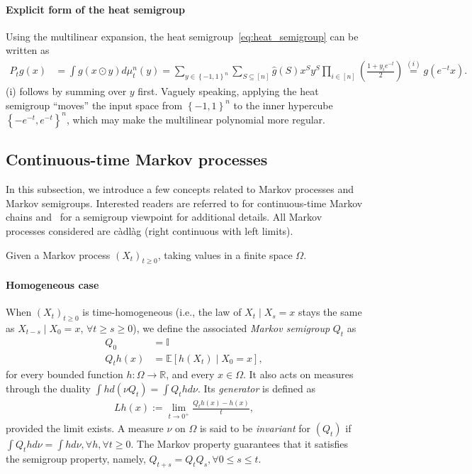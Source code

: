 \documentclass[11pt]{article}
\theoremstyle{named}
\theoremstyle{plain}
\newcommand{\defn}{:=}
\newcommand{\real}{\ensuremath{\mathbb{R}}}
\newcommand{\Ind}{\ensuremath{\mathbb{I}}}
\newcommand{\Exs}{\ensuremath{{\mathbb{E}}}}
\newcommand{\parenth}[1]{\left( #1 \right)}
\newcommand{\braces}[1]{\left\{ #1 \right \}}
\begin{document}
\paragraph{Explicit form of the heat semigroup} Using the multilinear expansion, the heat semigroup~\eqref{eq:heat_semigroup} can be written as
\begin{align}
  \label{eq:explicit_heat_seimgroup}
  P_t g (x) &= \int g(x \odot y) d\mu_t^n(y) = \sum_{y \in \braces{-1,1}^n} \sum_{S \subseteq [n]} \hat{g}(S) x^S y^S \prod_{i \in [n]} \parenth{\frac{1+y_i e^{-t}}{2}} \overset{(i)}{=} g(e^{-t} x).
\end{align}
(i) follows by summing over $y$ first. Vaguely speaking, applying the heat semigroup ``moves'' the input space from $\braces{-1,1}^n$ to the inner hypercube $\braces{-e^{-t}, e^{-t}}^n$, which may make the multilinear polynomial more regular.

\subsection{Continuous-time Markov processes}
\label{sub:continuous_time_Markov}
In this subsection, we introduce a few concepts related to Markov processes and Markov semigroups. Interested readers are referred to \cite{anderson2012continuous} for continuous-time Markov chains and~\cite{pazy2012semigroups} for a semigroup viewpoint for additional details. All Markov processes considered are c\`adl\`ag (right continuous with left limits).

Given a Markov process $(X_t)_{t \geq 0}$, taking values in a finite space $\Omega$.

\paragraph{Homogeneous case} When $(X_t)_{t \geq 0}$ is time-homogeneous (i.e., the law of $X_t \mid X_s = x$ stays the same as $X_{t-s} \mid X_0 = x$, $\forall t\geq s \geq 0$), we define the associated \textit{Markov semigroup} $Q_t$ as 
\begin{align*}
  Q_0 &= \Ind \\
  Q_t h(x) &= \Exs[h(X_t) \mid X_0 = x],
\end{align*}
for every bounded function $h: \Omega \to \real$, and every $x \in \Omega$. It also acts on measures through the duality $\int h d (\nu Q_t) = \int Q_t h d\nu$. Its \textit{generator} is defined as
\begin{align*}
  L h (x) \defn \lim_{t \to 0^+} \frac{Q_t h (x) - h(x)}{t},
\end{align*}
provided the limit exists. 
A measure $\nu$ on $\Omega$ is said to be \textit{invariant} for $(Q_t)$ if $\int Q_t h d\nu = \int h d \nu, \forall h, \forall t \geq 0$. The Markov property guarantees that it satisfies the semigroup property, namely, $Q_{t+s} = Q_t Q_s, \forall 0 \leq s \leq t$.
\end{document}
